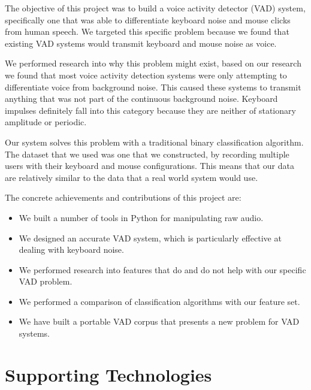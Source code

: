\documentclass[ %
                    author={Sam Phippen},
                supervisor={Dr. Rafal Bogacz},
                     title={Real time voice activity detectors in noisy personal computing environments},
                  subtitle={},
                    degree={MEng},
                      year={2012} ]{thesis}
\begin{document}
The objective of this project was to build a voice activity detector (VAD)
system, specifically one that was able to differentiate keyboard noise and
mouse clicks from human speech. We targeted this specific problem because
we found that existing VAD systems would transmit keyboard and mouse noise
as voice.

We performed research into why this problem might exist, based on our research
we found that most voice activity detection systems were only attempting to
differentiate voice from background noise. This caused these systems to
transmit anything that was not part of the continuous background noise.
Keyboard impulses definitely fall into this category because they are neither
of stationary amplitude or periodic.

Our system solves this problem with a traditional binary classification
algorithm. The dataset that we used was one that we constructed, by recording
multiple users with their keyboard and mouse configurations.  This means that
our data are relatively similar to the data that a real world system would use.

The concrete achievements and contributions of this project are:

\begin{itemize}

    \item We built a number of tools in Python for manipulating raw audio.

    \item We designed an accurate VAD system, which is particularly
        effective at dealing with keyboard noise.

    \item We performed research into features that do and do not help
        with our specific VAD problem.

    \item We performed a comparison of classification algorithms with our
        feature set.

    \item We have built a portable VAD corpus that presents a new problem for
        VAD systems.

\end{itemize}



\chapter*{Supporting Technologies}
\end{document}

